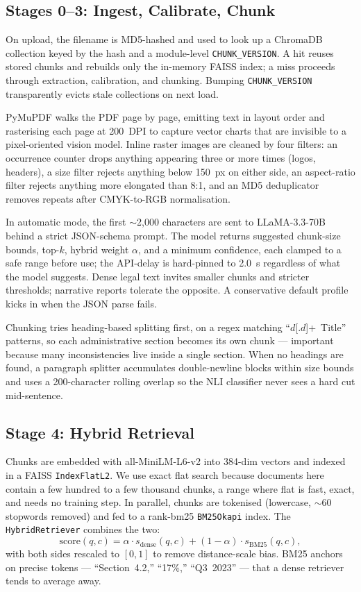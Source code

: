 \documentclass[conference]{IEEEtran}
\begin{document}
\subsection{Stages 0--3: Ingest, Calibrate, Chunk}
On upload, the filename is MD5-hashed and used to look up a ChromaDB collection keyed by the hash and a module-level \texttt{CHUNK\_VERSION}. A hit reuses stored chunks and rebuilds only the in-memory FAISS index; a miss proceeds through extraction, calibration, and chunking. Bumping \texttt{CHUNK\_VERSION} transparently evicts stale collections on next load.

PyMuPDF walks the PDF page by page, emitting text in layout order and rasterising each page at 200~DPI to capture vector charts that are invisible to a pixel-oriented vision model. Inline raster images are cleaned by four filters: an occurrence counter drops anything appearing three or more times (logos, headers), a size filter rejects anything below 150~px on either side, an aspect-ratio filter rejects anything more elongated than 8:1, and an MD5 deduplicator removes repeats after CMYK-to-RGB normalisation.

In automatic mode, the first $\sim$2{,}000 characters are sent to LLaMA-3.3-70B behind a strict JSON-schema prompt. The model returns suggested chunk-size bounds, top-$k$, hybrid weight $\alpha$, and a minimum confidence, each clamped to a safe range before use; the API-delay is hard-pinned to 2.0~s regardless of what the model suggests. Dense legal text invites smaller chunks and stricter thresholds; narrative reports tolerate the opposite. A conservative default profile kicks in when the JSON parse fails.

Chunking tries heading-based splitting first, on a regex matching ``$d$[.$d$]+~Title'' patterns, so each administrative section becomes its own chunk --- important because many inconsistencies live inside a single section. When no headings are found, a paragraph splitter accumulates double-newline blocks within size bounds and uses a 200-character rolling overlap so the NLI classifier never sees a hard cut mid-sentence.

\subsection{Stage 4: Hybrid Retrieval}
Chunks are embedded with all-MiniLM-L6-v2 into 384-dim vectors and indexed in a FAISS \texttt{IndexFlatL2}. We use exact flat search because documents here contain a few hundred to a few thousand chunks, a range where flat is fast, exact, and needs no training step. In parallel, chunks are tokenised (lowercase, $\sim$60 stopwords removed) and fed to a rank-bm25 \texttt{BM25Okapi} index. The \texttt{HybridRetriever} combines the two:
\begin{equation}
\text{score}(q, c) = \alpha \cdot s_{\text{dense}}(q, c) + (1-\alpha) \cdot s_{\text{BM25}}(q, c),
\label{eq:hybrid}
\end{equation}
with both sides rescaled to $[0,1]$ to remove distance-scale bias. BM25 anchors on precise tokens --- ``Section~4.2,'' ``17\%,'' ``Q3~2023'' --- that a dense retriever tends to average away.
\end{document}
